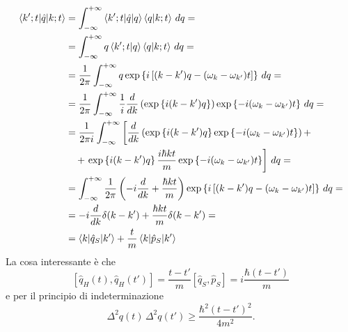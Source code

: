 \begin{align*}
\braket{k'; t|\hat{q}|k; t} &= \int_{-\infty}^{+\infty} \braket{k'; t|\hat{q}|q} \braket{q|k; t} \, dq = \\
&= \int_{-\infty}^{+\infty} q \braket{k'; t|q} \braket{q|k; t} \, dq = \\
&= \frac{1}{2\pi} \int_{-\infty}^{+\infty} q \exp \left\{ i \left[ (k - k')q - (\omega_k - \omega_{k'})t \right] \right\} \, dq = \\
&= \frac{1}{2\pi} \int_{-\infty}^{+\infty} \frac{1}{i} \frac{d}{dk} \left( \exp \left\{ i(k - k')q \right\} \right) \exp \left\{ -i(\omega_k - \omega_{k'})t \right\} \, dq = \\
&=  \frac{1}{2\pi i} \int_{-\infty}^{+\infty} \left[ \frac{d}{dk} \left( \exp \left\{ i(k - k')q \right\} \exp \left\{ -i(\omega_k - \omega_{k'})t \right\} \right)  + \right. \\
&\quad + \left. \exp \left\{ i(k - k')q \right\} \frac{i\hbar k t}{m} \exp \left\{ -i(\omega_k - \omega_{k'})t \right\} \right] \, dq = \\
&= \int_{-\infty}^{+\infty} \frac{1}{2\pi} \left( -i \frac{d}{dk} + \frac{\hbar k t}{m} \right) \exp \left\{ i \left[ (k - k')q - (\omega_k - \omega_{k'})t \right] \right\} \, dq = \\
&= -i \frac{d}{dk} \delta(k - k') + \frac{\hbar k t}{m} \delta(k - k') = \\
&= \braket{k|\hat{q}_S|k'} + \frac{t}{m} \braket{k|\hat{p}_S|k'}
\end{align*}
La cosa interessante è che
\[
\left[ \hat{q}_H(t), \hat{q}_H(t') \right] = \frac{t - t'}{m} \left[ \hat{q}_S, \hat{p}_S \right] = i \frac{\hbar(t - t')}{m}
\]
e per il principio di indeterminazione
\[
\Delta^2 q(t) \, \Delta^2 q(t') \geq \frac{\hbar^2 (t - t')^2}{4m^2}.
\]